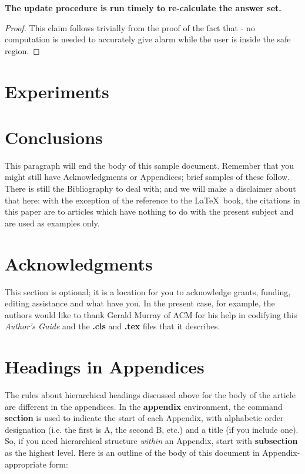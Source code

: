 \documentclass{sig-alternate}
\begin{document}
\textbf{The update procedure is run timely to re-calculate the answer set.}
\begin{proof} 
This claim follows trivially from the proof of the fact that - no computation is needed to accurately give alarm while the user is inside the safe region.
\end{proof}


\section{Experiments}


\section{Conclusions}
This paragraph will end the body of this sample document.
Remember that you might still have Acknowledgments or
Appendices; brief samples of these
follow.  There is still the Bibliography to deal with; and
we will make a disclaimer about that here: with the exception
of the reference to the \LaTeX\ book, the citations in
this paper are to articles which have nothing to
do with the present subject and are used as
examples only.

\section{Acknowledgments}
This section is optional; it is a location for you
to acknowledge grants, funding, editing assistance and
what have you.  In the present case, for example, the
authors would like to thank Gerald Murray of ACM for
his help in codifying this \textit{Author's Guide}
and the \textbf{.cls} and \textbf{.tex} files that it describes.



  
\appendix
\section{Headings in Appendices}
The rules about hierarchical headings discussed above for
the body of the article are different in the appendices.
In the \textbf{appendix} environment, the command
\textbf{section} is used to
indicate the start of each Appendix, with alphabetic order
designation (i.e. the first is A, the second B, etc.) and
a title (if you include one).  So, if you need
hierarchical structure
\textit{within} an Appendix, start with \textbf{subsection} as the
highest level. Here is an outline of the body of this
document in Appendix-appropriate form:
\end{document}
